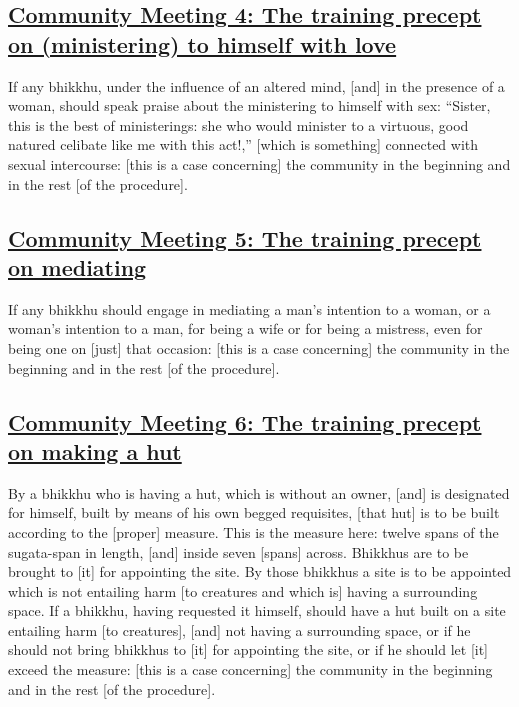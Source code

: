 \subsection*{\hyperref[sd4]{Community Meeting 4: The training precept on (ministering) to himself with love}}
\label{comm4}

If any bhikkhu, under the influence of an altered mind, [and] in the presence of a woman, should speak praise about the ministering to himself with sex: ``Sister, this is the best of ministerings: she who would minister to a virtuous, good natured celibate like me with this act!,'' [which is something] connected with sexual intercourse: [this is a case concerning] the community in the beginning and in the rest [of the procedure].



\subsection*{\hyperref[sd5]{Community Meeting 5: The training precept on mediating}}
\label{comm5}

If any bhikkhu should engage in mediating a man's intention to a woman, or a woman's intention to a man, for being a wife or for being a mistress, even for being one on [just] that occasion: [this is a case concerning] the community in the beginning and in the rest [of the procedure].



\subsection*{\hyperref[sd6]{Community Meeting 6: The training precept on making a hut}}
\label{comm6}

By a bhikkhu who is having a hut, which is without an owner, [and] is designated for himself, built by means of his own begged requisites, [that hut] is to be built according to the [proper] measure. This is the measure here: twelve spans of the sugata-span in length, [and] inside seven [spans] across. Bhikkhus are to be brought to [it] for appointing the site. By those bhikkhus a site is to be appointed which is not entailing harm [to creatures and which is] having a surrounding space. If a bhikkhu, having requested it himself, should have a hut built on a site entailing harm [to creatures], [and] not having a surrounding space, or if he should not bring bhikkhus to [it] for appointing the site, or if he should let [it] exceed the measure: [this is a case concerning] the community in the beginning and in the rest [of the procedure].



